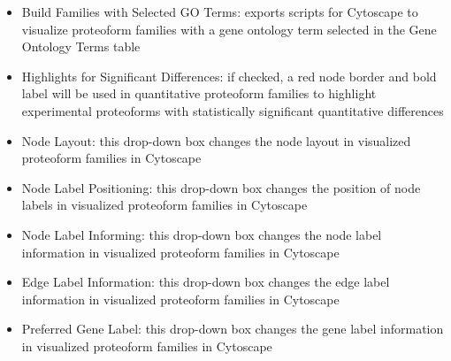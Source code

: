 \begin{itemize}
\item Build Families with Selected GO Terms: exports scripts for Cytoscape to visualize proteoform families with a gene ontology term selected in the Gene Ontology Terms table
\item Highlights for Significant Differences: if checked, a red node border and bold label will be used in quantitative proteoform families to highlight experimental proteoforms with statistically significant quantitative differences
\item Node Layout: this drop-down box changes the node layout in visualized proteoform families in Cytoscape
\item Node Label Positioning: this drop-down box changes the position of node labels in visualized proteoform families in Cytoscape
\item Node Label Informing: this drop-down box changes the node label information in visualized proteoform families in Cytoscape
\item Edge Label Information: this drop-down box changes the edge label information in visualized proteoform families in Cytoscape
\item Preferred Gene Label: this drop-down box changes the gene label information in visualized proteoform families in Cytoscape
\end{itemize}
